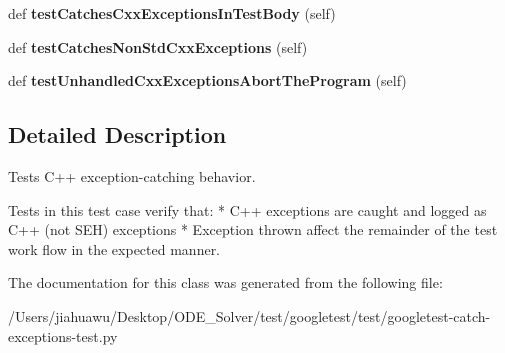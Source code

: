 \begin{DoxyCompactItemize}
def {\bfseries test\+Catches\+Cxx\+Exceptions\+In\+Test\+Body} (self)
\item 
\mbox{\label{classgoogletest-catch-exceptions-test_1_1_catch_cxx_exceptions_test_a01731aaf8269fc952559f5684b395119}} 
def {\bfseries test\+Catches\+Non\+Std\+Cxx\+Exceptions} (self)
\item 
\mbox{\label{classgoogletest-catch-exceptions-test_1_1_catch_cxx_exceptions_test_ab2304b62b833f0729e8909ad8615212c}} 
def {\bfseries test\+Unhandled\+Cxx\+Exceptions\+Abort\+The\+Program} (self)
\end{DoxyCompactItemize}


\subsection{Detailed Description}
\begin{DoxyVerb}Tests C++ exception-catching behavior.

   Tests in this test case verify that:
   * C++ exceptions are caught and logged as C++ (not SEH) exceptions
   * Exception thrown affect the remainder of the test work flow in the
     expected manner.
\end{DoxyVerb}
 

The documentation for this class was generated from the following file\+:\begin{DoxyCompactItemize}
\item 
/\+Users/jiahuawu/\+Desktop/\+O\+D\+E\+\_\+\+Solver/test/googletest/test/googletest-\/catch-\/exceptions-\/test.\+py\end{DoxyCompactItemize}
